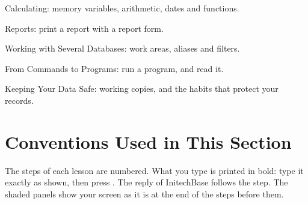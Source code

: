 Calculating: memory variables, arithmetic, dates and
functions.

Reports: print a report with a report form.

Working with Several Databases: work areas, aliases and
filters.

From Commands to Programs: run a program, and read it.

Keeping Your Data Safe: working copies, and the habits
that protect your records.

\section{Conventions Used in This Section}
The steps of each lesson are numbered.  What you type is printed in bold:
type it exactly as shown, then press .  The reply of InitechBase
follows the step.  The shaded panels show your screen as it is at the end of
the steps before them.
